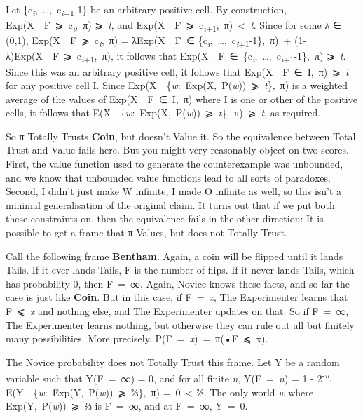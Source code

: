 \documentclass[
  11pt,
  letterpaper,
  DIV=11,
  numbers=noendperiod,
  twoside]{scrartcl}
\begin{document}
Let \{c\textsubscript{\emph{i}},~\ldots,~c\textsubscript{\emph{i}+1}-1\}
be an arbitrary positive cell. By construction,
Exp(X~\textbar~F~⩾~c\textsubscript{\emph{i}},~π) ⩾~\emph{t}, and
Exp(X~\textbar~F~⩾~c\textsubscript{\emph{i}+1},~π)~\textless~\emph{t}.
Since for some λ ∈ (0,1),
Exp(X~\textbar~F~⩾~c\textsubscript{\emph{i}},~π) = λExp(X~\textbar~F~∈
\{c\textsubscript{\emph{i}},~\ldots,~c\textsubscript{\emph{i}+1}-1\},~π)~+
(1-λ)Exp(X~\textbar~F~⩾~c\textsubscript{\emph{i}+1},~π), it follows that
Exp(X~\textbar~F~∈~\{c\textsubscript{\emph{i}},~\ldots,~c\textsubscript{\emph{i}+1}-1\},~π)
⩾~\emph{t}. Since this was an arbitrary positive cell, it follows that
Exp(X~\textbar~F~∈~I,~π)~⩾~\emph{t} for any positive cell I. Since
Exp(X~\textbar~\{\emph{w}:~Exp(X,~P(\emph{w}))~⩾~\emph{t}\},~π) is a
weighted average of the values of Exp(X~\textbar~F~∈~I,~π) where I is
one or other of the positive cells, it follows that
E(X~\textbar~\{\emph{w}:~Exp(X,~P(\emph{w}))~⩾~\emph{t}\},~π)~⩾~\emph{t},
as required.

So π Totally Trusts \textbf{Coin}, but doesn't Value it. So the
equivalence between Total Trust and Value fails here. But you might very
reasonably object on two scores. First, the value function used to
generate the counterexample was unbounded, and we know that unbounded
value functions lead to all sorts of paradoxes. Second, I didn't just
make W infinite, I made O infinite as well, so this isn't a minimal
generalisation of the original claim. It turns out that if we put both
these constraints on, then the equivalence fails in the other direction:
It is possible to get a frame that π Values, but does not Totally Trust.

Call the following frame \textbf{Bentham}. Again, a coin will be flipped
until it lands Tails. If it ever lands Tails, F is the number of flips.
If it never lands Tails, which has probability 0, then F~=~∞. Again,
Novice knows these facts, and so far the case is just like
\textbf{Coin}. But in this case, if F~=~\emph{x}, The Experimenter
learns that F~⩽~\emph{x} and nothing else, and The Experimenter updates
on that. So if F~=~∞, The Experimenter learns nothing, but otherwise
they can rule out all but finitely many possibilities. More precisely,
P(F~=~\emph{x})~=~π(•\textbar F~⩽~x).

The Novice probability does not Totally Trust this frame. Let Y be a
random variable such that Y(F~=~∞) = 0, and for all finite \emph{n},
Y(F~=~\emph{n}) = 1 - 2\textsuperscript{-\emph{n}}.
E(Y~\textbar~\{\emph{w}:~Exp(Y,~P(\emph{w}))~⩾~⅔\},~π) =~0~\textless{}
⅔. The only world \emph{w} where Exp(Y,~P(\emph{w}))~⩾~⅔ is F~=~∞, and
at F~=~∞, Y~=~0.
\end{document}
